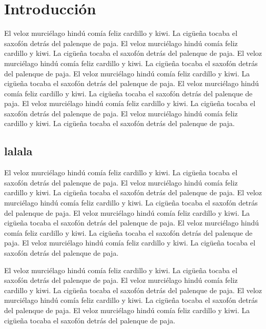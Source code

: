 \documentclass[a4paper,11pt,oneside]{report}
\begin{document}
\clearpage

\tableofcontents
{}

\clearpage

\pagestyle{fancy}

\chapter{Introducción}

El veloz murciélago hindú comía feliz cardillo y kiwi. La cigüeña tocaba el
saxofón detrás del palenque de paja.
El veloz murciélago hindú comía feliz cardillo y kiwi. La cigüeña tocaba el
saxofón detrás del palenque de paja.
El veloz murciélago hindú comía feliz cardillo y kiwi. La cigüeña tocaba el
saxofón detrás del palenque de paja.
El veloz murciélago hindú comía feliz cardillo y kiwi. La cigüeña tocaba el
saxofón detrás del palenque de paja.
El veloz murciélago hindú comía feliz cardillo y kiwi. La cigüeña tocaba el
saxofón detrás del palenque de paja.
El veloz murciélago hindú comía feliz cardillo y kiwi. La cigüeña tocaba el
saxofón detrás del palenque de paja.
El veloz murciélago hindú comía feliz cardillo y kiwi. La cigüeña tocaba el
saxofón detrás del palenque de paja.

\section{lalala}
El veloz murciélago hindú comía feliz cardillo y kiwi. La cigüeña tocaba el
saxofón detrás del palenque de paja.
El veloz murciélago hindú comía feliz cardillo y kiwi. La cigüeña tocaba el
saxofón detrás del palenque de paja.
El veloz murciélago hindú comía feliz cardillo y kiwi. La cigüeña tocaba el
saxofón detrás del palenque de paja.
El veloz murciélago hindú comía feliz cardillo y kiwi. La cigüeña tocaba el
saxofón detrás del palenque de paja.
El veloz murciélago hindú comía feliz cardillo y kiwi. La cigüeña tocaba el
saxofón detrás del palenque de paja.
El veloz murciélago hindú comía feliz cardillo y kiwi. La cigüeña tocaba el
saxofón detrás del palenque de paja.

El veloz murciélago hindú comía feliz cardillo y kiwi. La cigüeña tocaba el
saxofón detrás del palenque de paja.
El veloz murciélago hindú comía feliz cardillo y kiwi. La cigüeña tocaba el
saxofón detrás del palenque de paja.
El veloz murciélago hindú comía feliz cardillo y kiwi. La cigüeña tocaba el
saxofón detrás del palenque de paja.
El veloz murciélago hindú comía feliz cardillo y kiwi. La cigüeña tocaba el
saxofón detrás del palenque de paja.
\end{document}

